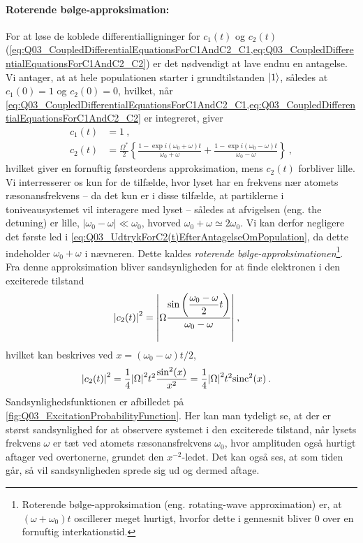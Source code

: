 \paragraph{Roterende bølge-approksimation:} For at løse de koblede differentialligninger for $c_1(t)$ og $c_2(t)$ (\cref{eq:Q03_CoupledDifferentialEquationsForC1AndC2_C1,eq:Q03_CoupledDifferentialEquationsForC1AndC2_C2}) er det nødvendigt at lave endnu en antagelse. Vi antager, at at hele populationen starter i grundtilstanden $\ket{1}$, således at $c_1(0) = 1$ og $c_2(0) = 0$, hvilket, når \cref{eq:Q03_CoupledDifferentialEquationsForC1AndC2_C1,eq:Q03_CoupledDifferentialEquationsForC1AndC2_C2} er integreret, giver
\begin{align}
    c_1(t) &= 1 \: , \label{eq:Q03_UdtrykForC1(t)EfterAntagelseOmPopulation}\\
    c_2(t) &= \frac{\Omega^*}{2} \left\{\frac{1 - \exp{i(\omega_0 + \omega)t}}{\omega_0 + \omega} + \frac{1 - \exp{i(\omega_0 - \omega)t}}{\omega_0 - \omega}\right\} \: , \label{eq:Q03_UdtrykForC2(t)EfterAntagelseOmPopulation}
\end{align}
hvilket giver en fornuftig førsteordens approksimation, mens $c_2(t)$ forbliver lille. Vi interresserer os kun for de tilfælde, hvor lyset har en frekvens nær atomets ræsonansfrekvens -- da det kun er i disse tilfælde, at partiklerne i toniveausystemet vil interagere med lyset -- således at afvigelsen (eng. the detuning) er lille, $|\omega_0 - \omega| \ll \omega_0$, hvorved $\omega_0 + \omega \simeq 2\omega_0$. Vi kan derfor negligere det første led i \cref{eq:Q03_UdtrykForC2(t)EfterAntagelseOmPopulation}, da dette indeholder $\omega_0 + \omega$ i nævneren. Dette kaldes \emph{roterende bølge-approksimationen}\footnote{Roterende bølge-approksimation (eng. rotating-wave approximation) er, at $(\omega + \omega_0)t$ oscillerer meget hurtigt, hvorfor dette i gennesnit bliver $0$ over en fornuftig interkationstid.}. Fra denne approksimation bliver sandsynligheden for at finde elektronen i den exciterede tilstand
\begin{align}
    \abs{c_2(t)}^2 &= \abs{\Omega \dfrac{\sin\left(\dfrac{\omega_0 - \omega}{2}t\right)}{\omega_0 - \omega}} \: ,
\end{align}
hvilket kan beskrives ved $x = (\omega_0 - \omega)t/2$,
\begin{align} \label{eq:Q03_ExcitationProbabilityFunction}
    \abs{c_2(t)}^2 &= \frac{1}{4}\abs{\Omega}^2t^2\frac{\sin^2(x)}{x^2} = \frac{1}{4}\abs{\Omega}^2t^2\mathrm{sinc}^2(x) \: .
\end{align}
Sandsynlighedsfunktionen er afbilledet på \cref{fig:Q03_ExcitationProbabilityFunction}. Her kan man tydeligt se, at der er størst sandsynlighed for at observere systemet i den exciterede tilstand, når lysets frekvens $\omega$ er tæt ved atomets ræsonansfrekvens $\omega_0$, hvor amplituden også hurtigt aftager ved overtonerne, grundet den $x^{-2}$-ledet. Det kan også ses, at som tiden går, så vil sandsynligheden sprede sig ud og dermed aftage.

